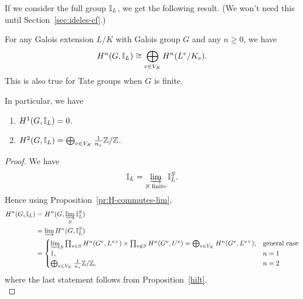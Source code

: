 If we consider the full group $\mathbb{I}_L$, we get the following result. (We won't need this until Section~\ref{sec:ideles-cf}.)
\begin{pr}
For any Galois extension $L/K$ with Galois group $G$ and any $n\ge 0$, we have
\[
H^n(G,\mathbb{I}_L)\cong \bigoplus_{v\in V_K} H^n(L^v/K_v).
\]
This is also true for Tate groups when $G$ is finite.

In particular, we have
\begin{enumerate}
\item
$H^1(G,\mathbb{I}_L)=0$.
\item
$H^2(G,\mathbb{I}_L)=\bigoplus_{v\in V_K} \frac{1}{n_v}\mathbb{Z}/\mathbb{Z}$.
\end{enumerate}
\end{pr}
\begin{proof}
We have
\[
\mathbb{I}_L=\varinjlim_{S\text{ finite}} \mathbb{I}_L^S.
\]
Hence using Proposition~\ref{pr:H-commutes-lim},
\begin{align*}
H^n(G,\mathbb{I}_L)&=H^n(G,\varinjlim_S \mathbb{I}_L^S)\\
&=\varinjlim H^n(G,\mathbb{I}_L^S)\\
&=
\begin{cases}
\varinjlim_S \prod_{v\in S}H^n(G^v,L^{v\times})\times \prod_{v\not\in S} H^n(G^v,U^v)=\bigoplus_{v\in V_K}H^n(G^v,L^{v\times}),&\text{general case}\\
1,&n=1\\
\bigoplus_{v\in V_K} \frac{1}{n_v}\mathbb{Z}/\mathbb{Z},&n=2
\end{cases}
\end{align*}
where the last statement follows from Proposition~\ref{hilt}.\\
\end{proof}
